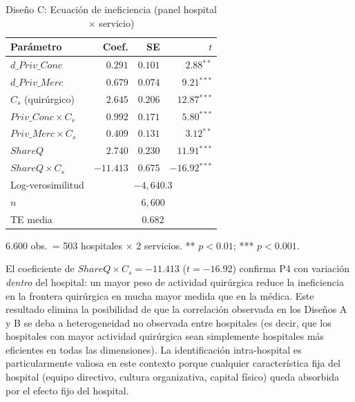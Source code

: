 \documentclass[12pt, a4paper, twoside, openright]{book}
\newcommand{\sig}[1]{\ensuremath{^{#1}}}
\theoremstyle{plain}
\theoremstyle{definition}
\theoremstyle{remark}
\begin{document}
\begin{table}[htbp]
\centering
\caption{Diseño C: Ecuación de ineficiencia (panel hospital $\times$ servicio)}
\label{tab:disC}
\begin{threeparttable}
\begin{tabular}{lrrr}
\toprule
\textbf{Parámetro} & \textbf{Coef.} & \textbf{SE} & \textbf{$t$} \\
\midrule
$d\_Priv\_Conc$ & $0.291$ & $0.101$ & $2.88$\sig{**} \\
$d\_Priv\_Merc$ & $0.679$ & $0.074$ & $9.21$\sig{***} \\
$C_s$ (quirúrgico) & $2.645$ & $0.206$ & $12.87$\sig{***} \\
$Priv\_Conc \times C_s$ & $0.992$ & $0.171$ & $5.80$\sig{***} \\
$Priv\_Merc \times C_s$ & $0.409$ & $0.131$ & $3.12$\sig{**} \\
$ShareQ$ & $2.740$ & $0.230$ & $11.91$\sig{***} \\
$ShareQ \times C_s$ & $-11.413$ & $0.675$ & $-16.92$\sig{***} \\
\midrule
Log-verosimilitud & \multicolumn{3}{c}{$-4{,}640.3$} \\
$n$ & \multicolumn{3}{c}{$6{,}600$} \\
TE media & \multicolumn{3}{c}{$0.682$} \\
\bottomrule
\end{tabular}
\begin{tablenotes}
  \small
  \item 6.600 obs.\ = 503 hospitales $\times$ 2 servicios. ** $p<0.01$; *** $p<0.001$.
\end{tablenotes}
\end{threeparttable}
\end{table}

El coeficiente de $ShareQ \times C_s = -11.413$ ($t=-16.92$) confirma P4 con variación \textit{dentro} del hospital: un mayor peso de actividad quirúrgica reduce la ineficiencia en la frontera quirúrgica en mucha mayor medida que en la médica. Este resultado elimina la posibilidad de que la correlación observada en los Diseños A y B se deba a heterogeneidad no observada entre hospitales (es decir, que los hospitales con mayor actividad quirúrgica sean simplemente hospitales más eficientes en todas las dimensiones). La identificación intra-hospital es particularmente valiosa en este contexto porque cualquier característica fija del hospital (equipo directivo, cultura organizativa, capital físico) queda absorbida por el efecto fijo del hospital.
\end{document}
